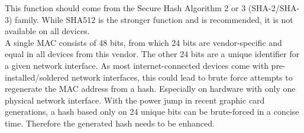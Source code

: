         This function should come from the Secure Hash Algorithm 2 or 3 (SHA-2/SHA-3) family. While SHA512 is the stronger function and is recommended, it is not available on all devices.\\
        A single MAC consists of 48 bits, from which 24 bits are vendor-specific and equal in all devices from this vendor. The other 24 bits are a unique identifier for a given network interface. As most internet-connected devices come with pre-installed/soldered network interfaces, this could lead to brute force attempts to regenerate the MAC address from a hash. Especially on hardware with only one physical network interface. With the power jump in recent graphic card generations, a hash based only on 24 unique bits can be brute-forced in a concise time. Therefore the generated hash needs to be enhanced.\\
        
